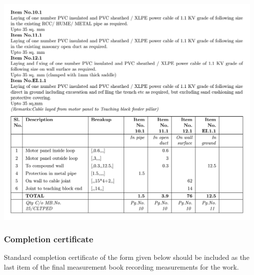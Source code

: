 \documentclass[twoside,a4paper]{refart}
\newenvironment{fminipage}[1]%
{\begin{Sbox}\begin{minipage}{#1}\begin{center}}%
		{\end{center}\end{minipage}\end{Sbox}\shadowbox{\TheSbox}}
\begin{document}
	 \begin{center}
	 	\begin{fminipage}{\textwidth}
	 		\includegraphics[width=1\linewidth]{figures/measurementLLLLL.pdf}
	 	\end{fminipage}
	 \end{center}
	 
	 \subsubsection{Completion certificate}
	 
	 Standard completion certificate of the form given below should be included as the last item of the final measurement book recording measurements for the work.
	 
\end{document}
